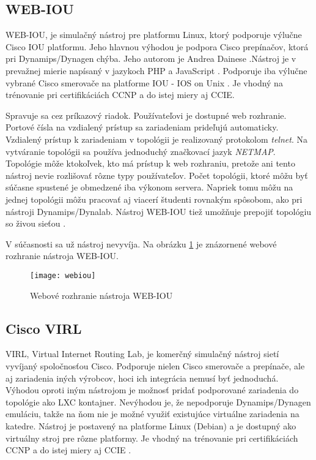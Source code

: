 \subsection{WEB-IOU}

WEB-IOU, je simulačný nástroj pre platformu Linux, ktorý podporuje výlučne Cisco IOU platformu. Jeho hlavnou výhodou je podpora Cisco prepínačov, ktorá pri Dynamips/Dynagen chýba. Jeho autorom je Andrea Dainese \cite{webiou_github, webiou_unetlab_unetlabv2}.Nástroj je v prevažnej mierie napísaný v jazykoch PHP a JavaScript \cite{webiou_github}. Podporuje iba výlučne vybrané Cisco smerovače na platforme IOU - IOS on Unix \cite{webiou_firewall_cx}. Je vhodný na trénovanie pri certifikáciách CCNP a do istej miery aj CCIE. 

Spravuje sa cez príkazový riadok. Používateľovi je dostupné web rozhranie. Portové čísla na vzdialený prístup sa zariadeniam prideľujú automaticky. Vzdialený prístup k zariadeniam v topológii je realizovaný protokolom \emph{telnet}. Na vytváranie topológii sa používa jednoduchý značkovací jazyk \emph{NETMAP}. Topológie môže ktokoľvek, kto má prístup k web rozhraniu, pretože ani tento nástroj nevie rozlišovať rôzne typy používateľov. Počet topológii, ktoré môžu byť súčasne spustené je obmedzené iba výkonom servera. Napriek tomu môžu na jednej topológii môžu pracovať aj viacerí študenti rovnakým spôsobom, ako pri nástroji Dynamips/Dynalab. Nástroj WEB-IOU tiež umožňuje prepojiť topológiu so živou sieťou \cite{webiou_real_network}. 

V súčasnosti sa už nástroj nevyvíja. Na obrázku \ref{obr:webiou} je znázornené webové rozhranie nástroja WEB-IOU.

\begin{figure}
    \centering
    \texttt{[image: webiou]}
    \caption{Webové rozhranie nástroja WEB-IOU} \cite{obr_webiou}
    \label{obr:webiou}
\end{figure}

\subsection{Cisco VIRL}

VIRL, Virtual Internet Routing Lab, je komerčný simulačný nástroj sietí vyvíjaný spoločnosťou Cisco. Podporuje nielen Cisco smerovače a prepínače, ale aj zariadenia iných výrobcov, hoci ich integrácia nemusí byť jednoduchá. Výhodou oproti iným nástrojom je možnosť pridať podporované zariadenia do topológie ako LXC kontajner. Nevýhodou je, že nepodporuje Dynamips/Dynagen emuláciu, takže na ňom nie je možné využiť existujúce virtuálne zariadenia na katedre. Nástroj je postavený na platforme Linux (Debian) a je dostupný ako virtuálny stroj pre rôzne platformy. Je vhodný na trénovanie pri certifikáciách CCNP a do istej miery aj CCIE \cite{virl_cisco}. 


